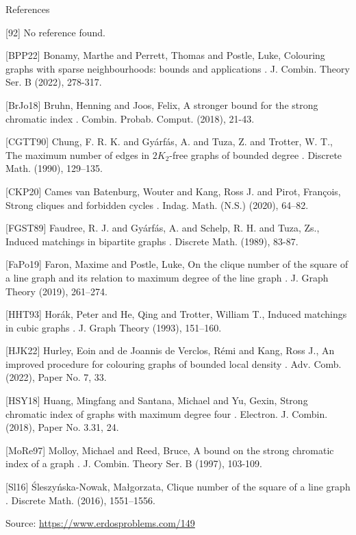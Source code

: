 \documentclass{article}
\begin{document}
References

[92] No reference found.


[BPP22] Bonamy, Marthe and Perrett, Thomas and Postle, Luke, Colouring graphs with sparse neighbourhoods: bounds and applications . J. Combin. Theory Ser. B (2022), 278-317.

[BrJo18] Bruhn, Henning and Joos, Felix, A stronger bound for the strong chromatic index . Combin. Probab. Comput. (2018), 21-43.

[CGTT90] Chung, F. R. K. and Gy\'{a}rf\'{a}s, A. and Tuza, Z. and Trotter, W. T., The maximum number of edges in {$2K_2$}-free graphs of bounded degree . Discrete Math. (1990), 129--135.

[CKP20] Cames van Batenburg, Wouter and Kang, Ross J. and Pirot, Fran\c cois, Strong cliques and forbidden cycles . Indag. Math. (N.S.) (2020), 64--82.

[FGST89] Faudree, R. J. and Gy\'{a}rf\'{a}s, A. and Schelp, R. H. and Tuza, Zs., Induced matchings in bipartite graphs . Discrete Math. (1989), 83-87.

[FaPo19] Faron, Maxime and Postle, Luke, On the clique number of the square of a line graph and its relation to maximum degree of the line graph . J. Graph Theory (2019), 261--274.

[HHT93] Hor\'{a}k, Peter and He, Qing and Trotter, William T., Induced matchings in cubic graphs . J. Graph Theory (1993), 151--160.

[HJK22] Hurley, Eoin and de Joannis de Verclos, R\'{e}mi and Kang, Ross J., An improved procedure for colouring graphs of bounded local density . Adv. Comb. (2022), Paper No. 7, 33.

[HSY18] Huang, Mingfang and Santana, Michael and Yu, Gexin, Strong chromatic index of graphs with maximum degree four . Electron. J. Combin. (2018), Paper No. 3.31, 24.

[MoRe97] Molloy, Michael and Reed, Bruce, A bound on the strong chromatic index of a graph . J. Combin. Theory Ser. B (1997), 103-109.

[Sl16] \'Sleszy\'nska-Nowak, Ma\l gorzata, Clique number of the square of a line graph . Discrete Math. (2016), 1551--1556.


\bigskip
\noindent\small{Source: \url{https://www.erdosproblems.com/149}}
\end{document}
